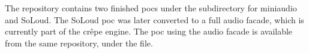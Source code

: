 \documentclass{projdoc}
\begin{document}
The repository \autocite{crepe:code-repo} contains two finished \glspl{poc} under the
 subdirectory for miniaudio and SoLoud. The SoLoud \gls{poc}
was later converted to a full audio \gls{facade}, which is currently part of the
cr\^epe engine. The \gls{poc} using the audio \gls{facade} is available from the same
repository, under the  file.
\end{document}
